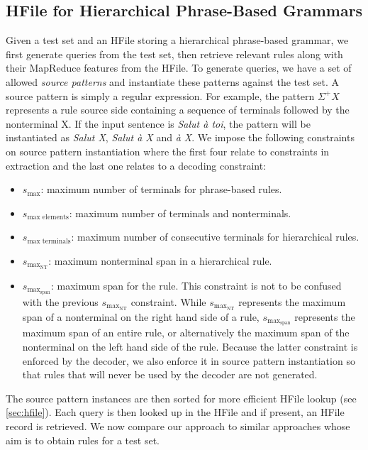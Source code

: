 \subsection{HFile for Hierarchical Phrase-Based Grammars}

Given a test set and an HFile storing a hierarchical phrase-based grammar, we
first generate queries from the test set, then retrieve relevant rules along
with their MapReduce features from the HFile. To generate queries, we have a set
of allowed \emph{source patterns} and instantiate these patterns against the
test set. A source pattern is simply a regular expression. For example, the
pattern $\Sigma^+X$ represents a rule source side containing a sequence of
terminals followed by the nonterminal X. If the input sentence is
\emph{Salut à toi}, the pattern will be instantiated as \emph{Salut X},
\emph{Salut à X} and \emph{à X}. We impose the following constraints on source pattern
instantiation where the first four relate to constraints in extraction and the
last one relates to a decoding constraint:
%
\begin{itemize}
  \item $s_{\text{max}}$: maximum number of terminals for phrase-based rules.
  \item $s_{\text{max elements}}$: maximum number of terminals and nonterminals.
  \item $s_{\text{max terminals}}$: maximum number of consecutive terminals for
    hierarchical rules.
  \item $s_{\text{max}_{\text{NT}}}$: maximum nonterminal span in a hierarchical
    rule.
  \item $s_{\text{max}_{\text{span}}}$: maximum span for the rule. This constraint
    is not to be confused with the previous $s_{\text{max}_{\text{NT}}}$ constraint.
    While $s_{\text{max}_{\text{NT}}}$ represents the maximum span of a nonterminal
    on the right hand side of a rule, $s_{\text{max}_{\text{span}}}$ represents the maximum span
    of an entire rule, or alternatively the maximum span of the nonterminal on the left
    hand side of the rule. Because the latter constraint is enforced by the decoder, we
    also enforce it in source pattern instantiation so that rules that will
    never be used by the decoder are not generated.
\end{itemize}
%
The source pattern instances are then sorted for more efficient HFile lookup
(see \autoref{sec:hfile}). Each query is then looked up in the HFile and if
present, an HFile record is retrieved.
We now compare our approach to similar approaches whose aim is
to obtain rules for a test set.

